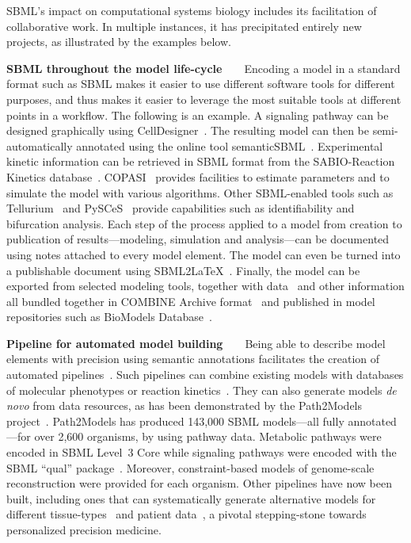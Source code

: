 \documentclass{sbml-paper}
\begin{document}
SBML's impact on computational systems biology includes its facilitation of collaborative work.  In multiple instances, it has precipitated entirely new projects, as illustrated by the examples below.

\textbf{SBML throughout the model life-cycle}~~~~Encoding a model in a standard format such as SBML makes it easier to use different software tools for different purposes, and thus makes it easier to leverage the most suitable tools at different points in a workflow.  The following is an example.  A signaling pathway can be designed graphically using CellDesigner~\citep{Funahashi2003celldesignera, Matsuoka2014modeling}. The resulting model can then be semi-automatically annotated using the online tool semanticSBML~\citep{krause2010annotation}. Experimental kinetic information can be retrieved in SBML format from the SABIO-Reaction Kinetics database~\citep{wittig2017sabio}. COPASI~\citep{hoops2006copasi} provides facilities to estimate parameters and to simulate the model with various algorithms. Other SBML-enabled tools such as Tellurium~\citep{Medley2018tellurium} and PySCeS~\citep{olivier2005modelling} provide capabilities such as identifiability and bifurcation analysis. Each step of the process applied to a model from creation to publication of results---modeling, simulation and analysis---can be documented using notes attached to every model element. The model can even be turned into a publishable document using SBML2\LaTeX~\citep{Draeger2009b}.  Finally, the model can be exported from selected modeling tools, together with data~\citep[perhaps represented in a neutral format such as SBRML;][]{dada2010sbrml} and other information all bundled together in COMBINE Archive format~\citep{bergmann2014combine} 
and published in model repositories such as BioModels Database~\citep{chelliah2014biomodels}.

\textbf{Pipeline for automated model building}~~~~Being able to describe model elements with precision using semantic annotations facilitates the creation of automated pipelines~\citep{Drager2010automating}. Such pipelines can combine existing models with databases of molecular phenotypes or reaction kinetics~\citep{li2010systematic}.  They can also generate models \emph{de novo} from data resources, as has been demonstrated by the Path2Models project~\citep{buchel2013path2models}. Path2Models has produced 143,000 SBML models---all fully annotated---for over 2,600 organisms, by using pathway data. Metabolic pathways were encoded in SBML Level~3 Core while signaling pathways were encoded with the SBML ``qual'' package~\citep{chaouiya2013sbml}. Moreover, constraint-based models of genome-scale reconstruction were provided for each organism. Other pipelines have now been built, including ones that can systematically generate alternative models for different tissue-types~\citep{wang2012reconstruction,thiele2013community} and patient data~\citep{uhlen2017pathology}, a pivotal stepping-stone towards personalized precision medicine.
\end{document}
